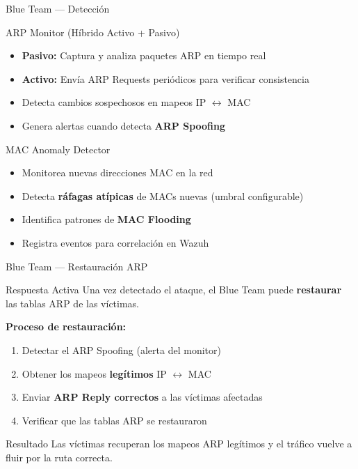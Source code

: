 \documentclass[aspectratio=169, 11pt]{beamer}
\begin{document}
\begin{frame}{Blue Team --- Detecci\'on}
\begin{block}{ARP Monitor (H\'ibrido Activo + Pasivo)}
\begin{itemize}
    \item \textbf{Pasivo:} Captura y analiza paquetes ARP en tiempo real
    \item \textbf{Activo:} Env\'ia ARP Requests peri\'odicos para verificar consistencia
    \item Detecta cambios sospechosos en mapeos IP $\leftrightarrow$ MAC
    \item Genera alertas cuando detecta \textbf{ARP Spoofing}
\end{itemize}
\end{block}
\vspace{0.5em}
\begin{block}{MAC Anomaly Detector}
\begin{itemize}
    \item Monitorea nuevas direcciones MAC en la red
    \item Detecta \textbf{r\'afagas at\'ipicas} de MACs nuevas (umbral configurable)
    \item Identifica patrones de \textbf{MAC Flooding}
    \item Registra eventos para correlaci\'on en Wazuh
\end{itemize}
\end{block}
\end{frame}

\begin{frame}{Blue Team --- Restauraci\'on ARP}
\begin{block}{Respuesta Activa}
Una vez detectado el ataque, el Blue Team puede \textbf{restaurar} las tablas ARP
de las v\'ictimas.
\end{block}
\vspace{0.5em}
\textbf{Proceso de restauraci\'on:}
\begin{enumerate}
    \item Detectar el ARP Spoofing (alerta del monitor)
    \item Obtener los mapeos \textbf{leg\'itimos} IP $\leftrightarrow$ MAC
    \item Enviar \textbf{ARP Reply correctos} a las v\'ictimas afectadas
    \item Verificar que las tablas ARP se restauraron
\end{enumerate}
\vspace{0.5em}
\begin{exampleblock}{Resultado}
Las v\'ictimas recuperan los mapeos ARP leg\'itimos y el tr\'afico
vuelve a fluir por la ruta correcta.
\end{exampleblock}
\end{frame}
\end{document}
